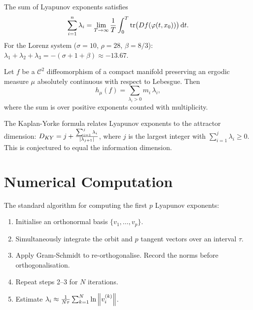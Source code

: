 \begin{proposition}
The sum of Lyapunov exponents satisfies
\[
    \sum_{i=1}^{n} \lambda_i = \lim_{T \to \infty} \frac{1}{T}
    \int_0^T \mathrm{tr}\bigl(Df(\varphi(t, x_0))\bigr)\,\mathrm{d}t.
\]
For the Lorenz system ($\sigma=10$, $\rho=28$, $\beta=8/3$):
$\lambda_1 + \lambda_2 + \lambda_3 = -(\sigma + 1 + \beta) \approx -13.67$.
\end{proposition}

\begin{theorem}
Let $f$ be a $\mathcal{C}^2$ diffeomorphism of a compact manifold preserving
an ergodic measure $\mu$ absolutely continuous with respect to Lebesgue. Then
\[
    h_\mu(f) = \sum_{\lambda_i > 0} m_i\,\lambda_i,
\]
where the sum is over positive exponents counted with multiplicity.
\end{theorem}

\begin{attention}[title=\textbf{Exponents and dimension}]
The Kaplan-Yorke formula relates Lyapunov exponents to the attractor
dimension: $D_{KY} = j + \frac{\sum_{i=1}^{j}\lambda_i}{\left| \lambda_{j+1} \right|}$,
where $j$ is the largest integer with $\sum_{i=1}^{j}\lambda_i \geq 0$. This
is conjectured to equal the information dimension.
\end{attention}

\section{Numerical Computation}

\begin{definition}
The standard algorithm for computing the first $p$ Lyapunov exponents:
\begin{enumerate}
    \item Initialise an orthonormal basis $\{v_1, \ldots, v_p\}$.
    \item Simultaneously integrate the orbit and $p$ tangent vectors over an
    interval $\tau$.
    \item Apply Gram-Schmidt to re-orthogonalise. Record the norms before
    orthogonalisation.
    \item Repeat steps 2--3 for $N$ iterations.
    \item Estimate $\lambda_i \approx \frac{1}{N\tau}\sum_{k=1}^{N}\ln\left\| v_i^{(k)} \right\|$.
\end{enumerate}
\end{definition}

